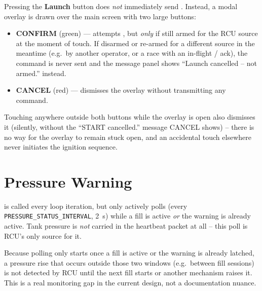 ﻿\documentclass[11pt,letterpaper]{article}
\begin{document}
Pressing the \textbf{Launch} button does \emph{not} immediately send
.  Instead, a modal overlay is drawn over the main screen
with two large buttons:

\begin{itemize}[nosep]
  \item \textbf{CONFIRM} (green) --- attempts , but
        \emph{only} if still armed for the RCU source at the moment of
        touch. If disarmed or re-armed for a different source in the
        meantime (e.g.\ by another operator, or a race with an in-flight
        / ack), the command is
        never sent and the message panel shows ``Launch cancelled -- not
        armed.'' instead.
  \item \textbf{CANCEL} (red) --- dismisses the overlay without transmitting
        any command.
\end{itemize}

Touching anywhere outside both buttons while the overlay is open also
dismisses it (silently, without the ``START cancelled.'' message CANCEL
shows) -- there is no way for the overlay to remain stuck open, and an
accidental touch elsewhere never initiates the ignition sequence.

\section{Pressure Warning}
\label{sec:pressure_warning}

\begin{sloppypar}
 is called every loop iteration, but only
actively polls  (every
\texttt{PRESSURE\_STATUS\_INTERVAL}, 2~s) while a fill is active \emph{or}
the warning is already active. Tank pressure is \emph{not} carried in the
heartbeat packet at all -- this poll is RCU's only source for it.
\end{sloppypar}

\begin{warningbox}
Because polling only starts once a fill is active or the warning is
already latched, a pressure rise that occurs outside those two windows
(e.g.\ between fill sessions) is not detected by RCU until the next fill
starts or another mechanism raises it. This is a real monitoring gap in
the current design, not a documentation nuance.
\end{warningbox}
\end{document}
